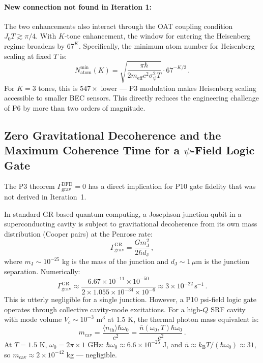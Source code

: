 \documentclass[11pt]{article}
\theoremstyle{definition}
\theoremstyle{remark}
\newcommand{\kB}{k_{\mathrm{B}}}
\begin{document}
\paragraph{New connection not found in Iteration 1:} The two enhancements also
interact through the OAT coupling condition $J_0 T \gtrsim \pi/4$. With
$K$-tone enhancement, the window for entering the Heisenberg regime broadens by
$67^K$. Specifically, the minimum atom number for Heisenberg scaling at fixed $T$
is:
\begin{equation}
N_{\mathrm{atom}}^{\min}(K) = \sqrt{\frac{\pi \hbar}{2 m_{\mathrm{eff}} c^2
\sigma_\psi^2 T}} \cdot 67^{-K/2}\,.
\label{eq:natom-min}
\end{equation}
For $K = 3$ tones, this is $547\times$ lower --- P3 modulation makes
Heisenberg scaling accessible to smaller BEC sensors. This directly reduces
the engineering challenge of P6 by more than two orders of magnitude.

\subsection{Zero Gravitational Decoherence and the Maximum Coherence Time
for a $\psi$-Field Logic Gate}
\label{sec:zero-decoherence-gate}

The P3 theorem $\Gamma_{\mathrm{grav}}^{\mathrm{DFD}} = 0$ has a direct
implication for P10 gate fidelity that was not derived in Iteration~1.

In standard GR-based quantum computing, a Josephson junction qubit in a
superconducting cavity is subject to gravitational decoherence from its own
mass distribution (Cooper pairs) at the Penrose rate:
\begin{equation}
\Gamma_{\mathrm{grav}}^{\mathrm{GR}} = \frac{G m_{\mathrm{J}}^2}{2\hbar d_{\mathrm{J}}}\,,
\end{equation}
where $m_{\mathrm{J}} \sim 10^{-25}$ kg is the mass of the junction and
$d_{\mathrm{J}} \sim 1\,\mu$m is the junction separation. Numerically:
\begin{equation}
\Gamma_{\mathrm{grav}}^{\mathrm{GR}} \approx
\frac{6.67\times 10^{-11} \times 10^{-50}}{2 \times 1.055\times 10^{-34}
\times 10^{-6}} \approx 3 \times 10^{-22}\,\mathrm{s}^{-1}\,.
\end{equation}
This is utterly negligible for a single junction. However, a P10 psi-field
logic gate operates through collective cavity-mode excitations. For a
high-$Q$ SRF cavity with mode volume $V_c \sim 10^{-3}$ m$^3$ at 1.5 K,
the thermal photon mass equivalent is:
\begin{equation}
m_{\mathrm{cav}} = \frac{\langle n_{\mathrm{th}}\rangle \hbar \omega_0}{c^2}
= \frac{\bar{n}(\omega_0,T) \hbar\omega_0}{c^2}\,.
\end{equation}
At $T = 1.5$ K, $\omega_0 = 2\pi \times 1$ GHz:
$\hbar\omega_0 \approx 6.6 \times 10^{-25}$ J, and
$\bar{n} \approx \kB T/(\hbar\omega_0) \approx 31$, so
$m_{\mathrm{cav}} \approx 2 \times 10^{-42}$ kg --- negligible.
\end{document}
